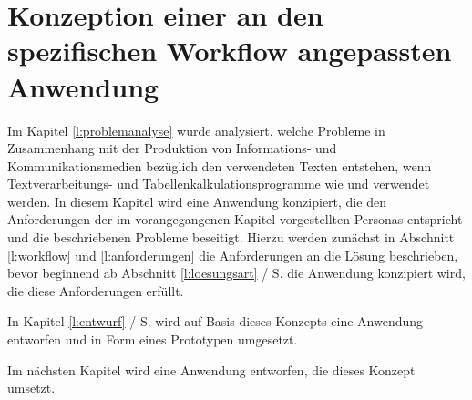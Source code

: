 \section{Konzeption einer an den spezifischen Workflow angepassten Anwendung}\label{l:konzeption}

Im Kapitel \ref{l:problemanalyse} wurde analysiert, welche Probleme in Zusammenhang mit der Produktion von Informations- und Kommunikationsmedien bezüglich den verwendeten Texten entstehen, wenn Textverarbeitungs- und Tabellenkalkulationsprogramme wie  und  verwendet werden. In diesem Kapitel wird eine Anwendung konzipiert, die den Anforderungen der im vorangegangenen Kapitel vorgestellten Personas entspricht und die beschriebenen Probleme beseitigt. Hierzu werden zunächst in Abschnitt \ref{l:workflow} und \ref{l:anforderungen} die Anforderungen an die Lösung beschrieben, bevor beginnend ab Abschnitt \ref{l:loesungsart} / S.\pageref{l:loesungsart} die Anwendung konzipiert wird, die diese Anforderungen erfüllt. 

\bigskip

In Kapitel \ref{l:entwurf} / S.\pageref{l:entwurf} wird auf Basis dieses Konzepts eine Anwendung entworfen und in Form eines Prototypen umgesetzt.









\bigskip

Im nächsten Kapitel wird eine Anwendung entworfen, die dieses Konzept umsetzt.

\pagebreak